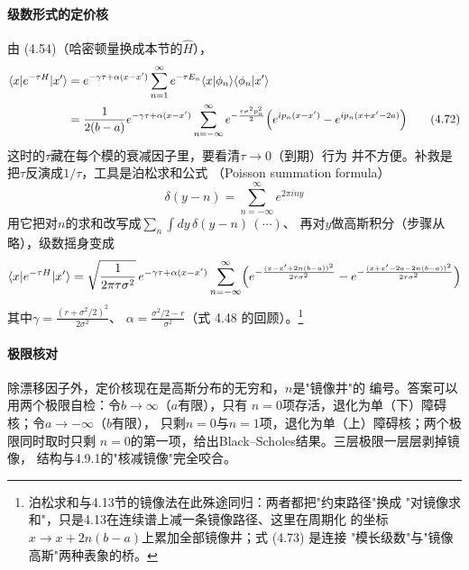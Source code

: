 \paragraph{级数形式的定价核}
由 (4.54)（哈密顿量换成本节的$\hat{H}$），
\begin{align*}
\langle x\vert e^{-\tau H}\vert x'\rangle
&=e^{-\gamma\tau+\alpha(x-x')}\sum_{n=1}^{\infty}e^{-\tau E_n}
\langle x\vert\phi_n\rangle\langle\phi_n\vert x'\rangle\\
&=\frac{1}{2(b-a)}e^{-\gamma\tau+\alpha(x-x')}\sum_{n=-\infty}^{\infty}
e^{-\frac{\tau\sigma^{2}p_n^{2}}{2}}
\Bigl(e^{ip_n(x-x')}-e^{ip_n(x+x'-2a)}\Bigr)
\tag{4.72}
\end{align*}
这时的$\tau$藏在每个模的衰减因子里，要看清$\tau\to0$（到期）行为
并不方便。补救是把$\tau$反演成$1/\tau$，工具是泊松求和公式
（Poisson summation formula）
\begin{equation*}
\delta(y-n)=\sum_{n=-\infty}^{\infty}e^{2\pi iny}
\tag{4.73}
\end{equation*}
用它把对$n$的求和改写成$\sum_n\int dy\,\delta(y-n)\,(\cdots)$、
再对$y$做高斯积分（步骤从略），级数摇身变成
\begin{equation*}
\langle x\vert e^{-\tau H}\vert x'\rangle=\sqrt{\frac{1}{2\pi\tau\sigma^{2}}}\,
e^{-\gamma\tau+\alpha(x-x')}\sum_{n=-\infty}^{\infty}
\Bigl(e^{-\frac{(x-x'+2n(b-a))^{2}}{2\tau\sigma^{2}}}
-e^{-\frac{(x+x'-2a-2n(b-a))^{2}}{2\tau\sigma^{2}}}\Bigr)
\end{equation*}
其中$\gamma=\frac{(r+\sigma^{2}/2)^{2}}{2\sigma^{2}}$、
$\alpha=\frac{\sigma^{2}/2-r}{\sigma^{2}}$（式 4.48 的回顾）。\footnote{
泊松求和与4.13节的镜像法在此殊途同归：两者都把"约束路径"换成
"对镜像求和"，只是4.13在连续谱上减一条镜像路径、这里在周期化
的坐标$x\to x+2n(b-a)$上累加全部镜像井；式 (4.73) 是连接
"模长级数"与"镜像高斯"两种表象的桥。}

\paragraph{极限核对}
除漂移因子外，定价核现在是高斯分布的无穷和，$n$是"镜像井"的
编号。答案可以用两个极限自检：令$b\to\infty$（$a$有限），只有
$n=0$项存活，退化为单（下）障碍核；令$a\to-\infty$（$b$有限），
只剩$n=0$与$n=1$项，退化为单（上）障碍核；两个极限同时取时只剩
$n=0$的第一项，给出Black--Scholes结果。三层极限一层层剥掉镜像，
结构与4.9.1的"核减镜像"完全咬合。

